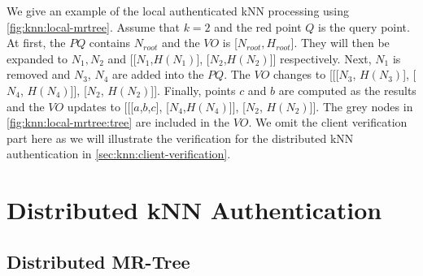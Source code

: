 We give an example of the local authenticated kNN processing using \cref{fig:knn:local-mrtree}. Assume that $k=2$ and the red point $Q$ is the query point. At first, the $PQ$ contains $N_{root}$ and the $VO$ is [$N_{root}, H_{root}$]. They will then be expanded to $N_1, N_2$ and [[$N_{1}$,$H(N_{1})$], [$N_{2}$,$H(N_{2})$]] respectively. Next, $N_{1}$ is removed and $N_{3}$, $N_{4}$ are added into the $PQ$. The $VO$ changes to [[[$N_{3}$, $H(N_{3})$], [$N_{4}$, $H(N_{4})$]], [$N_{2}$, $H(N_{2})$]]. Finally, points $c$ and $b$ are computed as the results and the $VO$ updates to [[[$a$,$b$,$c$], [$N_{4}$,$H(N_{4})$]], [$N_{2}$, $H(N_{2})$]]. The grey nodes in \cref{fig:knn:local-mrtree:tree} are included in the $VO$. We omit the client verification part here as we will illustrate the verification for the distributed kNN authentication in \cref{sec:knn:client-verification}.

\section{Distributed {kNN} Authentication}\label{sec:knn:distributed-knn}

\subsection{Distributed MR-Tree}

